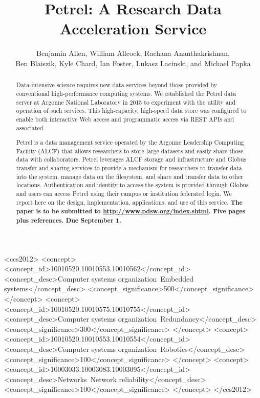 \documentclass[sigconf]{acmart}
\begin{document}
\title{Petrel: A Research Data Acceleration Service}

\author{Benjamin Allen, William Allcock, Rachana Ananthakrishnan,\\Ben Blaiszik, Kyle Chard, Ian Foster, Lukasz Lacinski, and Michael Papka}
\renewcommand{\shortauthors}{B. Allen et al.}


\begin{abstract}

Data-intensive science requires new data services beyond those provided by conventional
high-performance computing systems.
We established the Petrel data server at Argonne National Laboratory in 2015 to experiment with the utility and operation of such services.
This high-capacity, high-speed data store was configured to enable both interactive Web access
and programmatic access via REST APIs and associated 


Petrel is a data management service operated by the Argonne Leadership Computing Facility (ALCF)
that allows researchers to store large datasets and easily share those data with collaborators. 
Petrel leverages ALCF
storage and infrastructure and Globus transfer and sharing services to provide a mechanism for researchers to transfer data into the system, manage data on the filesystem, and share and transfer data to other locations. Authentication and identity to access the system is provided through Globus and users can access Petrel using their campus or institution federated login.
We report here on the design, implementation, applications, and use of this service.
\textbf{The paper is to be submitted to \url{http://www.pdsw.org/index.shtml}. Five pages plus references. Due September 1.}
\end{abstract}

%
%
\begin{CCSXML}
<ccs2012>
 <concept>
  <concept_id>10010520.10010553.10010562</concept_id>
  <concept_desc>Computer systems organization~Embedded systems</concept_desc>
  <concept_significance>500</concept_significance>
 </concept>
 <concept>
  <concept_id>10010520.10010575.10010755</concept_id>
  <concept_desc>Computer systems organization~Redundancy</concept_desc>
  <concept_significance>300</concept_significance>
 </concept>
 <concept>
  <concept_id>10010520.10010553.10010554</concept_id>
  <concept_desc>Computer systems organization~Robotics</concept_desc>
  <concept_significance>100</concept_significance>
 </concept>
 <concept>
  <concept_id>10003033.10003083.10003095</concept_id>
  <concept_desc>Networks~Network reliability</concept_desc>
  <concept_significance>100</concept_significance>
 </concept>
</ccs2012>  
\end{CCSXML}
\end{document}
